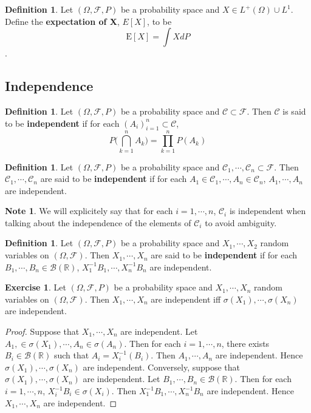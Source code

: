 \documentclass[12pt]{amsart}
\theoremstyle{definition}
\newtheorem{defn}[definition]{Definition}
\newtheorem{note}[definition]{Note}
\newtheorem{ex}[definition]{Exercise}
\newcommand{\sig}{\sigma}
\newcommand{\Om}{\Omega}
\newcommand{\R}{\mathbb{R}}
\newcommand{\MC}{\mathcal{C}}
\newcommand{\MB}{\mathcal{B}}
\newcommand{\MF}{\mathcal{F}}
\newcommand{\E}{\text{E}}
\begin{document}
	
	\begin{defn}
		Let $(\Om, \MF, P)$ be a probability space and $X \in L^+(\Om) \cup L^1$. Define the \textbf{expectation of X}, $E[X]$, to be $$\E[X] = \int X dP$$.
	\end{defn}
	
	
	\subsection{Independence}
	
	\begin{defn}
		Let $(\Om, \MF, P)$ be a probability space and $\MC \subset \MF$. Then $\MC$ is said to be \textbf{independent} if for each $(A_i)_{i=1}^n \subset \MC$, $$P \bigg( \bigcap_{k=1}^nA_k\bigg) = \prod_{k=1}^{n}P(A_k)$$
	\end{defn}
	
	\begin{defn}
		Let $(\Om, \MF, P)$ be a probability space and $\MC_1, \cdots, \MC_n \subset \MF$. Then $\MC_1, \cdots, \MC_n $ are said to be \textbf{independent} if for each $A_1 \in \MC_1,  \cdots, A_n \in \MC_n$, $A_1, \cdots, A_n$ are independent. 
	\end{defn}
	
	\begin{note}
		We will explicitely say that for each $i=1, \cdots , n$, $\MC_i$ is independent when talking about the independence of the elements of $\MC_i$ to avoid ambiguity.
	\end{note}
	
	\begin{defn}
		Let $(\Om, \MF, P)$ be a probability space and $X_1, \cdots, X_2$ random variables on $(\Om, \MF)$. Then $X_1, \cdots, X_n$ are said to be \textbf{independent} if for each $B_1, \cdots, B_n \in \MB(\R)$, $X_1^{-1}B_1, \cdots, X_n^{-1}B_n$ are independent.
	\end{defn}
	
	\begin{ex}
		Let $(\Om, \MF, P)$ be a probability space and $X_1, \cdots, X_n$ random variables on $(\Om, \MF)$. Then $X_1, \cdots, X_n$ are independent iff $\sig(X_1), \cdots, \sig(X_n)$ are independent.
	\end{ex}
	
	\begin{proof}
		Suppose that $X_1, \cdots, X_n$ are independent. Let $A_1, \in \sig(X_1), \cdots, A_n \in \sig(A_n)$. Then for each $i = 1, \cdots, n$, there exists $B_i \in \MB(\R)$ such that $A_i = X_i^{-1}(B_i)$. Then $A_1, \cdots, A_n$ are independent. Hence $\sig(X_1), \cdots, \sig(X_n)$ are independent. Conversely, suppose that $\sig(X_1), \cdots, \sig(X_n)$ are independent. Let $B_1, \cdots, B_n \in \MB(\R)$. Then for each $i = 1, \cdots, n$, $X_i^{-1}B_i \in \sig(X_i)$. Then $X_1^{-1}B_1, \cdots, X_n^{-1}B_n$ are independent. Hence $X_1, \cdots, X_n$ are independent.
	\end{proof}
	
\end{document}

